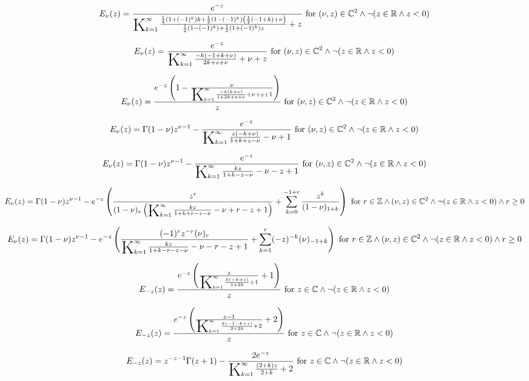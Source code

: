 \documentclass{article}
\newcommand{\bigK}{\mathop{\raisebox{-5pt}{\huge K}}}
\begin{document}
\[E_{\nu }(z)=\frac{e^{-z}}{\bigK_{k=1}^{\infty}\frac{\frac{1}{4} \left(1+(-1)^k\right) k+\frac{1}{2} \left(1-(-1)^k\right) \left(\frac{1}{2} (-1+k)+\nu \right)}{\frac{1}{2} \left(1-(-1)^k\right)+\frac{1}{2} \left(1+(-1)^k\right) z}+z}\text{ for }(\nu ,z)\in \mathbb{C}^2\land \neg (z\in \mathbb{R}\land z<0)\] 

\[E_{\nu }(z)=\frac{e^{-z}}{\bigK_{k=1}^{\infty}\frac{-k (-1+k+\nu )}{2 k+z+\nu }+\nu +z}\text{ for }(\nu ,z)\in \mathbb{C}^2\land \neg (z\in \mathbb{R}\land z<0)\] 

\[E_{\nu }(z)=\frac{e^{-z} \left(1-\frac{\nu }{\bigK_{k=1}^{\infty}\frac{-k (k+\nu )}{1+2 k+z+\nu }+\nu +z+1}\right)}{z}\text{ for }(\nu ,z)\in \mathbb{C}^2\land \neg (z\in \mathbb{R}\land z<0)\] 

\[E_{\nu }(z)=\Gamma (1-\nu ) z^{\nu -1}-\frac{e^{-z}}{\bigK_{k=1}^{\infty}\frac{z (-k+\nu )}{1+k+z-\nu }-\nu +1}\text{ for }(\nu ,z)\in \mathbb{C}^2\land \neg (z\in \mathbb{R}\land z<0)\] 

\[E_{\nu }(z)=\Gamma (1-\nu ) z^{\nu -1}-\frac{e^{-z}}{\bigK_{k=1}^{\infty}\frac{k z}{1+k-z-\nu }-\nu -z+1}\text{ for }(\nu ,z)\in \mathbb{C}^2\land \neg (z\in \mathbb{R}\land z<0)\] 

\[E_{\nu }(z)=\Gamma (1-\nu ) z^{\nu -1}-e^{-z} \left(\frac{z^r}{(1-\nu )_r \left(\bigK_{k=1}^{\infty}\frac{k z}{1+k+r-z-\nu }-\nu +r-z+1\right)}+\sum _{k=0}^{-1+r} \frac{z^k}{(1-\nu )_{1+k}}\right)\text{ for }r\in \mathbb{Z}\land (\nu ,z)\in \mathbb{C}^2\land \neg (z\in \mathbb{R}\land z<0)\land r\geq 0\] 

\[E_{\nu }(z)=\Gamma (1-\nu ) z^{\nu -1}-e^{-z} \left(\frac{(-1)^r z^{-r} (\nu )_r}{\bigK_{k=1}^{\infty}\frac{k z}{1+k-r-z-\nu }-\nu -r-z+1}+\sum _{k=1}^r (-z)^{-k} (\nu )_{-1+k}\right)\text{ for }r\in \mathbb{Z}\land (\nu ,z)\in \mathbb{C}^2\land \neg (z\in \mathbb{R}\land z<0)\land r\geq 0\] 

\[E_{-z}(z)=\frac{e^{-z} \left(\frac{z}{\bigK_{k=1}^{\infty}\frac{k (-k+z)}{1+2 k}+1}+1\right)}{z}\text{ for }z\in \mathbb{C}\land \neg (z\in \mathbb{R}\land z<0)\] 

\[E_{-z}(z)=\frac{e^{-z} \left(\frac{z-1}{\bigK_{k=1}^{\infty}\frac{k (-1-k+z)}{2+2 k}+2}+2\right)}{z}\text{ for }z\in \mathbb{C}\land \neg (z\in \mathbb{R}\land z<0)\] 

\[E_{-z}(z)=z^{-z-1} \Gamma (z+1)-\frac{2 e^{-z}}{\bigK_{k=1}^{\infty}\frac{(2+k) z}{2+k}+2}\text{ for }z\in \mathbb{C}\land \neg (z\in \mathbb{R}\land z<0)\] 
\end{document}
